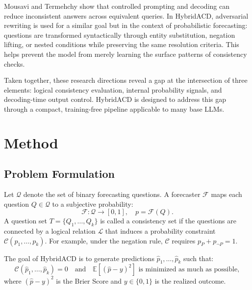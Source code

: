 \documentclass[pdflatex,sn-mathphys-num]{sn-jnl}
\begin{document}
Mousavi and Termehchy \cite{ref8} show that controlled prompting and decoding can reduce inconsistent answers across equivalent queries. In HybridACD, adversarial rewriting is used for a similar goal but in the context of probabilistic forecasting: questions are transformed syntactically through entity substitution, negation lifting, or nested conditions while preserving the same resolution criteria. This helps prevent the model from merely learning the surface patterns of consistency checks.

Taken together, these research directions reveal a gap at the intersection of three elements: logical consistency evaluation, internal probability signals, and decoding-time output control. HybridACD is designed to address this gap through a compact, training-free pipeline applicable to many base LLMs.

\section{Method}\label{sec:method}

\subsection{Problem Formulation}

Let $\mathcal{Q}$ denote the set of binary forecasting questions. A forecaster $\mathcal{F}$ maps each question $Q \in \mathcal{Q}$ to a subjective probability:
\begin{equation}
  \mathcal{F}: \mathcal{Q} \rightarrow [0,1], \quad p=\mathcal{F}(Q).
\end{equation}
A question set $T=\{Q_1,\ldots,Q_k\}$ is called a consistency set if the questions are connected by a logical relation $\mathcal{L}$ that induces a probability constraint $\mathcal{C}(p_1,\ldots,p_k)$. For example, under the negation rule, $\mathcal{C}$ requires $p_P+p_{\neg P}=1$.

The goal of HybridACD is to generate predictions $\hat{p}_1,\ldots,\hat{p}_k$ such that:
\begin{equation}
  \mathcal{C}(\hat{p}_1,\ldots,\hat{p}_k)=0
  \quad \text{and} \quad
  \mathbb{E}[(\hat{p}-y)^2] \text{ is minimized as much as possible},
\end{equation}
where $(\hat{p}-y)^2$ is the Brier Score and $y\in\{0,1\}$ is the realized outcome.
\end{document}
